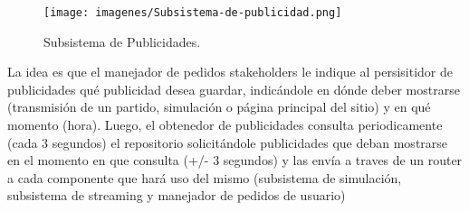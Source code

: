 \begin{figure}[H]
  \centering
  \texttt{[image: imagenes/Subsistema-de-publicidad.png]}
  \caption{Subsistema de Publicidades.}
\end{figure}

La idea es que el manejador de pedidos stakeholders le indique al persisitidor de publicidades qué publicidad desea
guardar, indicándole en dónde deber mostrarse (transmisión de un partido, simulación o página principal del sitio) y en qué momento (hora).
Luego, el obtenedor de publicidades consulta periodicamente (cada 3 segundos) el repositorio solicitándole publicidades que deban mostrarse
en el momento en que consulta (+/- 3 segundos) y las envía a traves de un router a cada componente que hará uso del mismo (subsistema de
 simulación, subsistema de streaming y manejador de pedidos de usuario)
